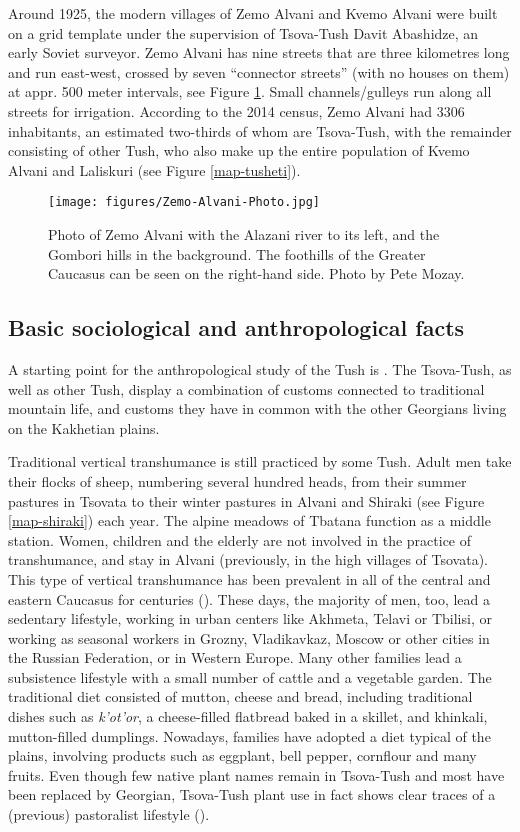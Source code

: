 Around 1925, the modern villages of Zemo Alvani and Kvemo Alvani were built on a grid template under the supervision of Tsova-Tush Davit Abashidze, an early Soviet surveyor. Zemo Alvani has nine streets that are three kilometres long and run east-west, crossed by seven “connector streets” (with no houses on them) at appr. 500 meter intervals, see Figure \ref{photo-alvani}. Small channels/gulleys run along all streets for irrigation. According to the 2014 census, Zemo Alvani had 3306 inhabitants, an estimated two-thirds of whom are Tsova-Tush, with the remainder consisting of other Tush, who also make up the entire population of Kvemo Alvani and Laliskuri (see Figure \ref{map-tusheti}).

\begin{figure}
	\texttt{[image: figures/Zemo-Alvani-Photo.jpg]}
	\caption{Photo of Zemo Alvani with the Alazani river to its left, and the Gombori hills in the background. The foothills of the Greater Caucasus can be seen on the right-hand side. Photo by Pete Mozay.}
	\label{photo-alvani}
\end{figure}

\subsection{Basic sociological and anthropological facts} \label{sociology}

A starting point for the anthropological study of the Tush is \textcite{makalatia1933tusheti}. The Tsova-Tush, as well as other Tush, display a combination of customs connected to traditional mountain life, and customs they have in common with the other Georgians living on the Kakhetian plains. 

Traditional vertical transhumance is still practiced by some Tush. Adult men take their flocks of sheep, numbering several hundred heads, from their summer pastures in Tsovata to their winter pastures in Alvani and Shiraki (see Figure \ref{map-shiraki}) each year. The alpine meadows of Tbatana function as a middle station. Women, children and the elderly are not involved in the practice of transhumance, and stay in Alvani (previously, in the high villages of Tsovata). This type of vertical transhumance has been prevalent in all of the central and eastern Caucasus for centuries (\cites[57]{wixman1980ethnic}). These days, the majority of men, too, lead a sedentary lifestyle, working in urban centers like Akhmeta, Telavi or Tbilisi, or working as seasonal workers in Grozny, Vladikavkaz, Moscow or other cities in the Russian Federation, or in Western Europe. Many other families lead a subsistence lifestyle with a small number of cattle and a vegetable garden. The traditional diet consisted of mutton, cheese and bread, including traditional dishes such as \textit{k'ot'or}, a cheese-filled flatbread baked in a skillet, and khinkali, mutton-filled dumplings. Nowadays, families have adopted a diet typical of the plains, involving products such as eggplant, bell pepper, cornflour and many fruits. Even though few native plant names remain in Tsova-Tush and most have been replaced by Georgian, Tsova-Tush plant use in fact shows clear traces of a (previous) pastoralist lifestyle (\cite[393]{pieronietal20}).


